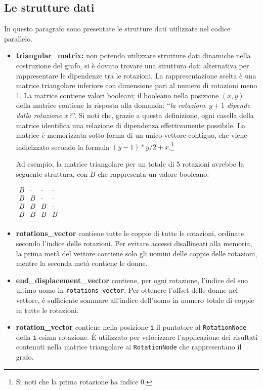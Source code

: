 \documentclass[12pt]{article}
\newcommand{\quotes}[1]{``\textit{#1}''}
\begin{document}
    \subsection{Le strutture dati}
    \label{StruttureDatiParallele}
    In questo paragrafo sono presentate le strutture dati utilizzate nel codice parallelo. 
    \begin{itemize}
        \item \textbf{triangular\_matrix:} non potendo utilizzare strutture dati dinamiche nella costruzione del grafo, si è dovuto trovare una struttura dati alternativa per rappresentare le dipendenze tra le rotazioni. La rappresentazione scelta è una matrice triangolare inferiore con dimensione pari al numero di rotazioni meno 1. La matrice contiene valori booleani; il booleano nella posizione $(x,y)$ della matrice contiene la risposta alla domanda: \quotes{la rotazione $y+1$ dipende dalla rotazione $x$?}. Si noti che, grazie a questa definizione, ogni casella della matrice identifica una relazione di dipendenza effettivamente possibile. La matrice è memorizzata sotto forma di un unico vettore contiguo, che viene indicizzato secondo la formula $(y-1)*y/2 + x$.\footnote{Si noti che la prima rotazione ha indice $0$.}
        
        Ad esempio, la matrice triangolare per un totale di 5 rotazioni avrebbe la seguente struttura, con $B$ che rappresenta un valore booleano: 

        \begin{center}
            \begin{math}
                \begin{matrix}
                    B & \cdot & \cdot & \cdot \\
                    B & B & \cdot & \cdot \\
                    B & B & B & \cdot \\
                    B & B & B & B \\
                \end{matrix}
            \end{math}
        \end{center}
        
        \item \textbf{rotations\_vector} contiene tutte le coppie di tutte le rotazioni, ordinate secondo l'indice delle rotazioni. Per evitare accessi disallineati alla memoria, la prima metà del vettore contiene solo gli uomini delle coppie delle rotazioni, mentre la seconda metà contiene le donne.
        \item \textbf{end\_displacement\_vector} contiene, per ogni rotazione, l'indice del suo ultimo uomo in \texttt{rotations\_vector}. Per ottenere l'offset delle donne nel vettore, è sufficiente sommare all'indice dell'uomo in numero totale di coppie in tutte le rotazioni.
        \item \textbf{rotation\_vector} contiene nella posizione \texttt{i} il puntatore al \texttt{RotationNode} della \texttt{i}-esima rotazione. È utilizzato per velocizzare l'applicazione dei risultati contenuti nella matrice triangolare ai \texttt{RotationNode} che rappresentano il grafo.
    \end{itemize}
\end{document}
